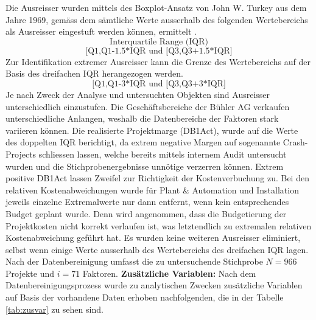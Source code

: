 \newline\newline
Die Ausreisser wurden mittels des Boxplot-Ansatz von John W. Turkey aus dem Jahre 1969, gemäss dem sämtliche Werte ausserhalb des folgenden Wertebereichs als Ausreisser eingestuft werden können, ermittelt \citep{lifengli16}.
\begin{equation*}
\text{Interquartile Range (IQR)}
\end{equation*}
\begin{equation*}
\text{[Q1,Q1-1.5*IQR und [Q3,Q3+1.5*IQR]}
\end{equation*}
Zur Identifikation extremer Ausreisser kann die Grenze des Wertebereichs auf der Basis des dreifachen IQR herangezogen werden.
\begin{equation*}
\text{[Q1,Q1-3*IQR und [Q3,Q3+3*IQR]}
\end{equation*}
Je nach Zweck der Analyse und untersuchten Objekten sind Ausreisser unterschiedlich einzustufen. Die Geschäftsbereiche der Bühler AG verkaufen unterschiedliche Anlangen, weshalb die Datenbereiche der Faktoren stark variieren können. Die realisierte Projektmarge (DB1Act), wurde auf die Werte des doppelten IQR berichtigt, da extrem negative Margen auf sogenannte Crash-Projects schliessen lassen, welche bereits mittels internem Audit untersucht wurden und die Stichprobenergebnisse unnötige verzerren können. Extrem positive DB1Act lassen Zweifel zur Richtigkeit der Kostenverbuchung zu. Bei den relativen Kostenabweichungen wurde für Plant \& Automation und Installation jeweils einzelne Extremalwerte nur dann entfernt, wenn kein entsprechendes Budget geplant wurde. Denn wird angenommen, dass die Budgetierung der Projektkosten nicht korrekt verlaufen ist, was letztendlich zu extremalen relativen Kostenabweichung geführt hat. Es wurden keine weiteren Ausreisser eliminiert, selbst wenn einige Werte ausserhalb des Wertebereichs des dreifachen IQR lagen. Nach der Datenbereinigung umfasst die zu untersuchende Stichprobe $N = 966$ Projekte und $ i = 71$ Faktoren.
\newline\newline
\textbf{Zusätzliche Variablen:} Nach dem Datenbereinigungsprozess wurde zu analytischen Zwecken zusätzliche Variablen auf Basis der vorhandene Daten erhoben nachfolgenden, die in der Tabelle \ref{tab:zusvar} zu sehen sind.
